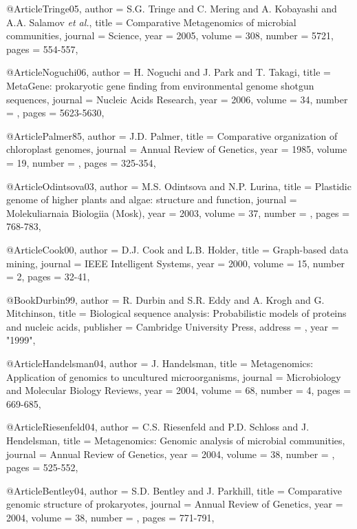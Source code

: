 
@Article{Tringe05,
  author = {S.G. Tringe and C. Mering and A. Kobayashi and A.A. Salamov {\it et al.}},
  title =  {Comparative Metagenomics of microbial communities},
  journal = {Science},
  year = {2005},
  volume =  {308},
  number =  {5721},
  pages =   {554-557},
}

@Article{Noguchi06,
  author = {H. Noguchi and J. Park and T. Takagi},
  title =  {{MetaGene: prokaryotic gene finding from environmental genome shotgun sequences}},
  journal = {Nucleic Acids Research},
  year = {2006},
  volume =  {34},
  number =  {},
  pages =   {5623-5630},
}

@Article{Palmer85,
  author = {J.D. Palmer},
  title =  {Comparative organization of chloroplast genomes},
  journal = {Annual Review of Genetics},
  year = {1985},
  volume =  {19},
  number =  {},
  pages =   {325-354},
}

@Article{Odintsova03,
  author = {M.S. Odintsova and N.P. Lurina},
  title =  {Plastidic genome of higher plants and algae: structure and function},
  journal = {Molekuliarnaia Biologiia (Mosk)},
  year = {2003},
  volume =  {37},
  number =  {},
  pages =   {768-783},
}


@Article{Cook00,
  author = {D.J. Cook and L.B. Holder},
  title =  {Graph-based data mining},
  journal = {IEEE Intelligent Systems},
  year = {2000},
  volume =  {15},
  number =  {2},
  pages =   {32-41},
}

@Book{Durbin99,
  author = {R. Durbin and S.R. Eddy and A. Krogh and G. Mitchinson},
  title =  {{Biological sequence analysis: Probabilistic models of proteins and nucleic acids}},
  publisher = {Cambridge University Press},
  address   =  {},
  year =     "1999",
}

@Article{Handelsman04,
  author = {J. Handelsman},
  title =  {{Metagenomics: Application of genomics to uncultured microorganisms}},
  journal = {Microbiology and Molecular Biology Reviews},
  year = {2004},
  volume =  {68},
  number =  {4},
  pages =   {669-685},
}

@Article{Riesenfeld04,
  author = {C.S. Riesenfeld and P.D. Schloss and J. Hendelsman},
  title =  {{Metagenomics: Genomic analysis of microbial communities}},
  journal = {Annual Review of Genetics},
  year = {2004},
  volume =  {38},
  number =  {},
  pages =   {525-552},
}

@Article{Bentley04,
  author = {S.D. Bentley and J. Parkhill},
  title =  {{Comparative genomic structure of prokaryotes}},
  journal = {Annual Review of Genetics},
  year = {2004},
  volume =  {38},
  number =  {},
  pages =   {771-791},
}



